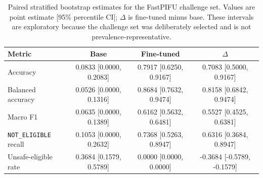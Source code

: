\begin{table}[htbp]
\centering
\caption{Paired stratified bootstrap estimates for the FastPIFU challenge set. Values are point estimate [95\% percentile CI]; $\Delta$ is fine-tuned minus base. These intervals are exploratory because the challenge set was deliberately selected and is not prevalence-representative.}
\label{tab:pifu_challenge_set_bootstrap}
\begin{tabular}{lccc}
\toprule
Metric & Base & Fine-tuned & $\Delta$ \\
\midrule
Accuracy & 0.0833 [0.0000, 0.2083] & 0.7917 [0.6250, 0.9167] & 0.7083 [0.5000, 0.9167] \\
Balanced accuracy & 0.0526 [0.0000, 0.1316] & 0.8684 [0.7632, 0.9474] & 0.8158 [0.6842, 0.9474] \\
Macro F1 & 0.0635 [0.0000, 0.1389] & 0.6162 [0.5632, 0.6481] & 0.5527 [0.4525, 0.6381] \\
\texttt{NOT\_ELIGIBLE} recall & 0.1053 [0.0000, 0.2632] & 0.7368 [0.5263, 0.8947] & 0.6316 [0.3684, 0.8947] \\
Unsafe-eligible rate & 0.3684 [0.1579, 0.5789] & 0.0000 [0.0000, 0.0000] & -0.3684 [-0.5789, -0.1579] \\
\bottomrule
\end{tabular}
\end{table}
